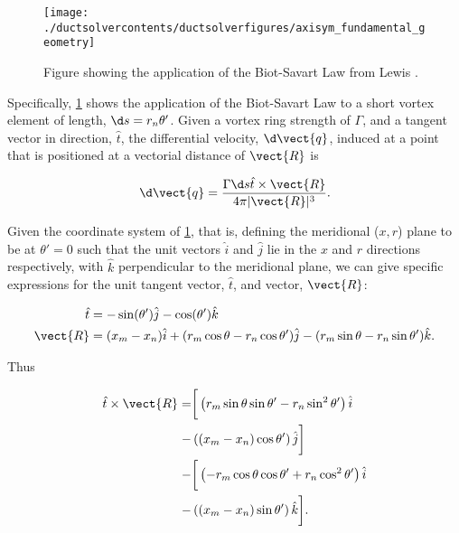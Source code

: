 \begin{figure}[h!]
	\centering
	\texttt{[image: ./ductsolvercontents/ductsolverfigures/axisym\_fundamental\_geometry]}
	\caption{Figure showing the application of the Biot-Savart Law from Lewis \cite{Lewis_1991}.}
	\label{fig:axisym_fundamental_geometry}
\end{figure}

Specifically, \cref{fig:axisym_fundamental_geometry} shows the application of the Biot-Savart Law to a short vortex element of length, \(\d s= r_n\theta'\).
Given a vortex ring strength of \(\Gamma\), and a tangent vector in direction, \(\hat{t}\), the differential velocity, \(\d \vect{q}\), induced at a point that is positioned at a vectorial distance of \(\vect{R}\) is

\begin{equation}
\label{eqn:biotsavart}
	\d \vect{q} = \frac{\Gamma \d s \hat{t} \times \vect{R}}{4\pi|\vect{R}|^3}.
\end{equation}

Given the coordinate system of \cref{fig:axisym_fundamental_geometry}, that is, defining the meridional (\(x,r\)) plane to be at \(\theta'=0\) such that the unit vectors \(\hat{i}\) and \(\hat{j}\) lie in the \(x\) and \(r\) directions respectively, with \(\hat{k}\) perpendicular to the meridional plane, we can give specific expressions for the unit tangent vector, \(\hat{t}\), and vector, \(\vect{R}\):

\begin{align}
	\hat{t} &= -\sin(\theta')\hat{j} - \cos(\theta')\hat{k} \\
	\vect{R} &= (x_m - x_n)\hat{i} + (r_m \cos \theta - r_n \cos \theta')\hat{j} - (r_m \sin \theta - r_n \sin \theta')\hat{k}.
\end{align}

Thus

\begin{equation}
\begin{split}
	\hat{t} \times \vect{R} =& \bigg[ \left(r_m \sin \theta \sin \theta' - r_n \sin^2 \theta' \right) \hat{i} \\
 	-& \left((x_m-x_n) \cos \theta' \right) \hat{j} \bigg] \\
	-&\bigg[ \left(-r_m \cos \theta \cos \theta' + r_n \cos^2 \theta' \right) \hat{i} \\
 	-& \left((x_m-x_n) \sin \theta' \right) \hat{k} \bigg].
\end{split}
\end{equation}

